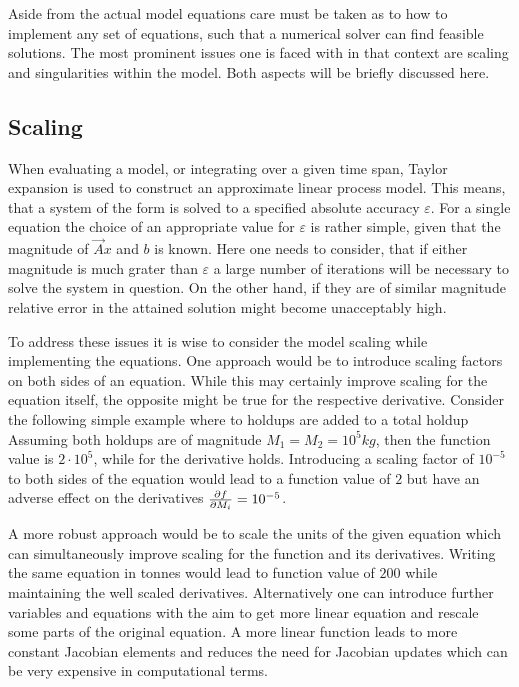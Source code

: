     Aside from the actual model equations care must be taken as to how to implement any set of equations,
    such that a numerical solver can find feasible solutions. The most prominent issues one is faced with in
    that context are scaling and singularities within the model. Both aspects will be briefly discussed here.

        \subsection{Scaling}
        When evaluating a model, or integrating over a given time span, Taylor expansion is used to construct
        an approximate linear process model. This means, that a system of the form
        is solved to a specified absolute accuracy $\varepsilon$. For a single equation the choice of an appropriate
        value for $\varepsilon$ is rather simple, given that the magnitude of $\vec{A} x$ and $b$ is known.
        Here one needs to consider, that if either magnitude is much grater than $\varepsilon$ a large number
        of iterations will be necessary to solve the system in question. On the other hand, if they are of similar
        magnitude relative error in the attained solution might become unacceptably high.

        To address these issues it is wise to consider the model scaling while implementing the equations.
        One approach would be to introduce scaling factors on both sides of an equation. While this
        may certainly improve scaling for the equation itself, the opposite might be true for the respective derivative.
        Consider the following simple example \cite{MarkPinto.2008} where to holdups are added to a total holdup
        Assuming both holdups are of magnitude $M_1 = M_2 = 10^5kg$, then the function value is $2 \cdot 10^5$, while for
        the derivative
        holds. Introducing a scaling factor of $10^{-5}$ to both sides of the equation would lead to a function value
        of $2$ but have an adverse effect on the derivatives $\frac{\partial f}{\partial M_i} = 10^{-5}$.

        A more robust approach would be to scale the units of the given equation which can simultaneously improve
        scaling for the function and its derivatives. Writing the same equation in tonnes would lead to  function value of
        $200$ while maintaining the well scaled derivatives. Alternatively one can introduce further variables and equations
        with the aim to get more linear equation and rescale some parts of the original equation. A more linear function
        leads to more constant Jacobian elements and reduces the need for Jacobian updates which can be very expensive in
        computational terms.

